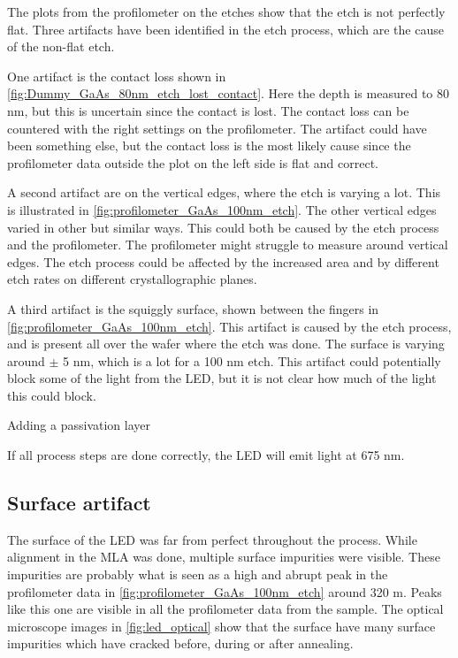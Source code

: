 The plots from the profilometer on the etches show that the etch is not perfectly flat.
Three artifacts have been identified in the etch process, which are the cause of the non-flat etch.

One artifact is the contact loss shown in \autoref{fig:Dummy_GaAs_80nm_etch_lost_contact}. 
Here the depth is measured to 80 nm, but this is uncertain since the contact is lost.
The contact loss can be countered with the right settings on the profilometer. 
The artifact could have been something else, but the contact loss is the most likely cause since the profilometer data outside the plot on the left side is flat and correct. 

A second artifact are on the vertical edges, where the etch is varying a lot. 
This is illustrated in \autoref{fig:profilometer_GaAs_100nm_etch}.
The other vertical edges varied in other but similar ways. 
This could both be caused by the etch process and the profilometer.
The profilometer might struggle to measure around vertical edges. 
The etch process could be affected by  the increased area and by different etch rates on different crystallographic planes.

A third artifact is the squiggly surface, shown between the fingers in \autoref{fig:profilometer_GaAs_100nm_etch}. 
This artifact is caused by the etch process, and is present all over the wafer where the etch was done. 
The surface is varying around $\pm$ 5 nm, which is a lot for a 100 nm etch.
This artifact could potentially block some of the light from the LED, but it is not clear how much of the light this could block.





Adding a passivation layer %

If all process steps are done correctly, the LED will emit light at 675 nm.  


\subsection{Surface artifact}
\label{sec:discussion:surface_artifact}

The surface of the LED was far from perfect throughout the process.
While alignment in the MLA was done, multiple surface impurities were visible. 
These impurities are probably what is seen as a high and abrupt peak in the profilometer data in \autoref{fig:profilometer_GaAs_100nm_etch} around 320 \textmu m.
Peaks like this one are visible in all the profilometer data from the sample. 
The optical microscope images in \autoref{fig:led_optical} show that the surface have many surface impurities which have cracked before, during or after annealing. 


